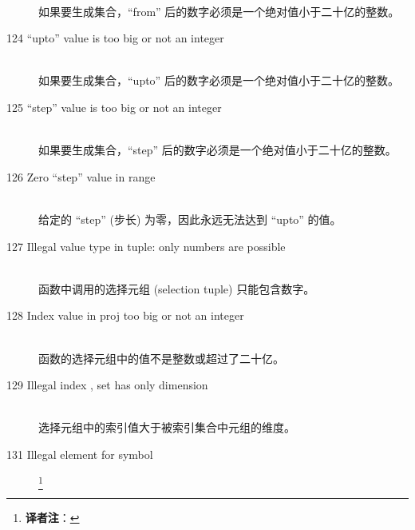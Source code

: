 \begin{description}
{   }\ \\
   如果要生成集合，``from'' 后的数字必须是一个绝对值小于二十亿的整数。
\item[124 ``upto'' value \code{xxx} is too big or not an integer]\ \\
   如果要生成集合，``upto'' 后的数字必须是一个绝对值小于二十亿的整数。
\item[125 ``step'' value \code{xxx} is too big or not an integer]\ \\
   如果要生成集合，``step'' 后的数字必须是一个绝对值小于二十亿的整数。
\item[126 Zero ``step'' value in range]\ \\
   给定的 ``step'' (步长) 为零，因此永远无法达到 ``upto'' 的值。
\item[127 Illegal value type in tuple: \code{xxx} only numbers are
   possible]\ \\
   函数中调用的选择元组 (selection tuple) 只能包含数字。
\item[128 Index value \code{xxx} in proj too big or not an integer]\ \\
   函数的选择元组中的值不是整数或超过了二十亿。
\item[129 Illegal index \code{xxx}, set has only dimension \code{yyy}]\ \\
   选择元组中的索引值大于被索引集合中元组的维度。
\item[131 Illegal element \code{xxx} for symbol]\footnote{\textbf{译者注}：
}
\end{description}
